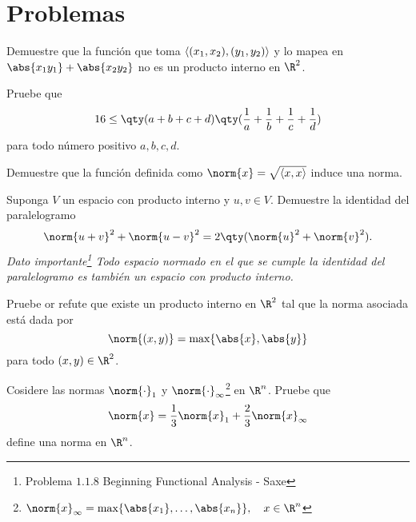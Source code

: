 \pagebreak


\section*{Problemas}

\begin{ejercicio}
	Demuestre que la función que toma $\langle (x_1 ,x_2) , (y_1 , y_2) \rangle$ y lo mapea en $\abs{x_1 y_1} + \abs{x_2 y_2}$ no es un producto interno en $\R ^2$.
\end{ejercicio}







\begin{ejercicio}
	Pruebe que
		$$ 16 \leq \qty(a + b + c + d)\qty(\frac{1}{a} + \frac{1}{b} + \frac{1}{c} + \frac{1}{d}) $$
	para todo número positivo $a,b,c,d$.
\end{ejercicio}







\begin{ejercicio}
	Demuestre que la función definida como $\norm{x} = \sqrt{\inner{x}{x}}$ induce una norma.
\end{ejercicio}



\begin{ejercicio}
	Suponga $V$ un espacio con producto interno y $u,v \in V$. Demuestre la identidad del paralelogramo
		$$ \norm{u + v} ^2 + \norm{u - v} ^2 = 2\qty(\norm{u} ^2 + \norm{v} ^2). $$
	\textit{Dato importante\footnote{Problema $1.1.8$ Beginning Functional Analysis - Saxe} Todo espacio normado en el que se cumple la identidad del paralelogramo es también un espacio con producto interno.}
\end{ejercicio}







\begin{ejercicio}
	Pruebe or refute que existe un producto interno en $\R ^2$ tal que la norma asociada está dada por
		$$ \norm{(x,y)} = \text{max}\{ \abs{x},\abs{y} \} $$
	para todo $(x,y) \in \R ^2$.
\end{ejercicio}










\begin{ejercicio}
	Cosidere las normas $\norm{\cdot} _1$ y $\norm{\cdot}_\infty$\footnote{$\norm{x}_\infty = \text{max}\{ \abs{x_1},\ldots ,\abs{x_n} \}, \quad x\in \R ^n$} en $\R ^n$. Pruebe que 
		$$ \norm{x} = \frac{1}{3} \norm{x}_1 + \frac{2}{3} \norm{x}_\infty $$
	define una norma en $\R ^n$.
\end{ejercicio}







